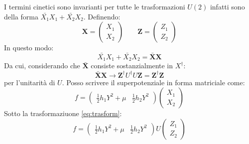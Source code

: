 \documentclass[]{scrartcl}
\begin{document}
I termini cinetici sono invarianti per tutte le trasformazioni $ U(2) $ infatti sono della forma $ \bar{X_1} X_1 +  \bar{X_2} X_2  $.
Definendo:
\[
  \mathbf{X} =
  \begin{pmatrix}
    X_1                               \\
    X_2
  \end{pmatrix}
  \qquad
  \mathbf{Z} =
  \begin{pmatrix}
    Z_1                               \\
    Z_2
   \end{pmatrix}
\]
In questo modo:
\[
  \bar{X_1} X_1 +  \bar{X_2} X_2 = \bar{\mathbf{X}} \mathbf{X}
\]
Da cui, considerando che $  \bar{\mathbf{X}} $ consiste sostanzialmente in $ X^\dagger $:
\[
  \bar{\mathbf{X}} \mathbf{X} \rightarrow \mathbf{Z}^\dagger U^\dagger U \mathbf{Z} = \mathbf{Z}^\dagger \mathbf{Z}
\]
per l'unitarità di $ U $.
Posso scrivere il superpotenziale in forma matriciale come:
\[
  f =
  \begin{pmatrix}
    \frac{1}{2}h_1 Y^2 + \mu        &
    \frac{1}{2}h_2 Y^2
  \end{pmatrix}
  \begin{pmatrix}
    X_1                                                                                                                                                                           \\
    X_2
  \end{pmatrix}
\]
Sotto la trasformaziuone \eqref{eq:trasform}:
\[
  f =
  \begin{pmatrix}
    \frac{1}{2}h_1 Y^2 + \mu        &
    \frac{1}{2}h_2 Y^2
  \end{pmatrix}
  U
  \begin{pmatrix}
    Z_1                                                                                                                                                                           \\
    Z_2
  \end{pmatrix}
\]
\end{document}
